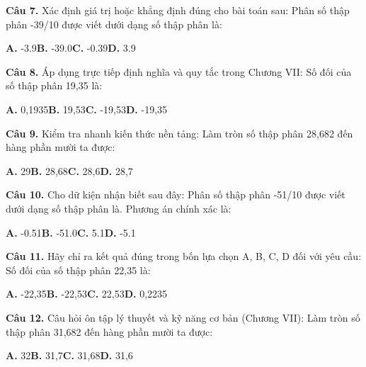 \documentclass[11pt,a4paper]{article}
\begin{document}
\textbf{\color{primary} Câu 7.} Xác định giá trị hoặc khẳng định đúng cho bài toán sau: Phân số thập phân -39/10 được viết dưới dạng số thập phân là:\par
\hspace*{1.5em}\textbf{A.} -3.9\quad\quad \textbf{B.} -39.0\quad\quad \textbf{C.} -0.39\quad\quad \textbf{D.} 3.9\par\vspace{2pt}
\textbf{\color{primary} Câu 8.} Áp dụng trực tiếp định nghĩa và quy tắc trong Chương VII: Số đối của số thập phân 19,35 là:\par
\hspace*{1.5em}\textbf{A.} 0,1935\quad\quad \textbf{B.} 19,53\quad\quad \textbf{C.} -19,53\quad\quad \textbf{D.} -19,35\par\vspace{2pt}
\textbf{\color{primary} Câu 9.} Kiểm tra nhanh kiến thức nền tảng: Làm tròn số thập phân 28,682 đến hàng phần mười ta được:\par
\hspace*{1.5em}\textbf{A.} 29\quad\quad \textbf{B.} 28,68\quad\quad \textbf{C.} 28,6\quad\quad \textbf{D.} 28,7\par\vspace{2pt}
\textbf{\color{primary} Câu 10.} Cho dữ kiện nhận biết sau đây: Phân số thập phân -51/10 được viết dưới dạng số thập phân là. Phương án chính xác là:\par
\hspace*{1.5em}\textbf{A.} -0.51\quad\quad \textbf{B.} -51.0\quad\quad \textbf{C.} 5.1\quad\quad \textbf{D.} -5.1\par\vspace{2pt}
\textbf{\color{primary} Câu 11.} Hãy chỉ ra kết quả đúng trong bốn lựa chọn A, B, C, D đối với yêu cầu: Số đối của số thập phân 22,35 là:\par
\hspace*{1.5em}\textbf{A.} -22,35\quad\quad \textbf{B.} -22,53\quad\quad \textbf{C.} 22,53\quad\quad \textbf{D.} 0,2235\par\vspace{2pt}
\textbf{\color{primary} Câu 12.} Câu hỏi ôn tập lý thuyết và kỹ năng cơ bản (Chương VII): Làm tròn số thập phân 31,682 đến hàng phần mười ta được:\par
\hspace*{1.5em}\textbf{A.} 32\quad\quad \textbf{B.} 31,7\quad\quad \textbf{C.} 31,68\quad\quad \textbf{D.} 31,6\par\vspace{2pt}
\end{document}
